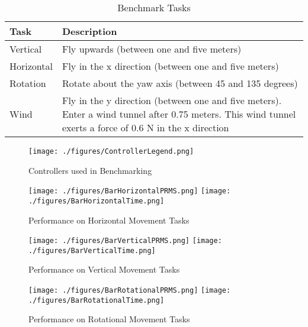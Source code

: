 \documentclass[letterpaper,12pt,titlepage,oneside,final]{book}
\begin{document}
\begin{table}
\caption{Benchmark Tasks} \label{table:tasks}
\begin{center}
\begin{tabular}{| l | p{9cm} |}

\hline
\textbf{Task} & \textbf{Description} \\ \hline
Vertical & Fly upwards (between one and five meters) \\ \hline
Horizontal & Fly in the x direction (between one and five meters) \\ \hline
Rotation & Rotate about the yaw axis (between 45 and 135 degrees) \\ \hline
Wind & Fly in the y direction (between one and five meters). Enter a wind tunnel after 0.75 meters. This wind tunnel exerts a force of 0.6 N in the x direction \\ \hline

\end{tabular}
\end{center}
\end{table}

\begin{figure}
\centering
\texttt{[image: ./figures/ControllerLegend.png]}
\caption{Controllers used in Benchmarking}\label{fig:bar_legend}
\end{figure}

\begin{figure}
\centering
\texttt{[image: ./figures/BarHorizontalPRMS.png]}
\texttt{[image: ./figures/BarHorizontalTime.png]}
\caption{Performance on Horizontal Movement Tasks}\label{fig:bar_horizontal}
\captionsetup{singlelinecheck=off,font=footnotesize}
\caption*{}
\end{figure}

\begin{figure}
\centering
\texttt{[image: ./figures/BarVerticalPRMS.png]}
\texttt{[image: ./figures/BarVerticalTime.png]}
\caption{Performance on Vertical Movement Tasks}\label{fig:bar_vertical}
\captionsetup{singlelinecheck=off,font=footnotesize}
\caption*{}
\end{figure}

\begin{figure}
\centering
\texttt{[image: ./figures/BarRotationalPRMS.png]}
\texttt{[image: ./figures/BarRotationalTime.png]}
\caption{Performance on Rotational Movement Tasks}\label{fig:bar_rotational}
\captionsetup{singlelinecheck=off,font=footnotesize}
\caption*{}
\end{figure}
\end{document}
